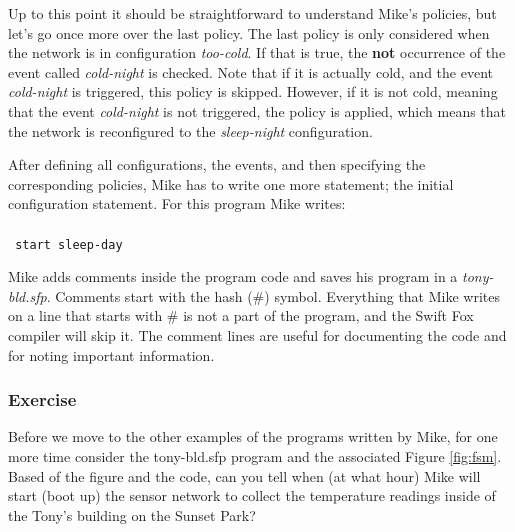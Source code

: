 Up to this point it should be straightforward to understand Mike's
policies, but let's go once more over the last policy. The last policy is
only considered when the network is in configuration \textit{too-cold}. If 
that is true, the \textbf{not} occurrence of the event called
\textit{cold-night} is checked. Note that if it is actually cold, and the
event \textit{cold-night} is triggered, this policy is skipped. However, if
it is not cold, meaning that the event \textit{cold-night} is not
triggered, the policy is applied, which means that the network is
reconfigured to the \textit{sleep-night} configuration. 

After defining all configurations, the events, and then specifying
the corresponding policies, Mike has to write one more statement; the
initial configuration statement. For this program Mike writes:		\\
\\
\texttt{
start sleep-day								\\
}

Mike adds comments inside the program code and saves his program in 
a \textit{tony-bld.sfp}. Comments start with the hash (\#) symbol. 
Everything that Mike writes on a line that starts with \# is not 
a part of the program, and the Swift Fox compiler will skip it. 
The comment lines are useful for
documenting the code and for noting important information.

\vspace{\fill}

\subsubsection{Exercise}

Before we move to the other examples of the programs written by 
Mike, for one more time consider the tony-bld.sfp program and 
the associated Figure \ref{fig:fsm}. Based of the figure and 
the code, can you tell when (at what hour) Mike will start (boot up)
the sensor network to collect the temperature readings 
inside of the Tony's building on the Sunset Park?

